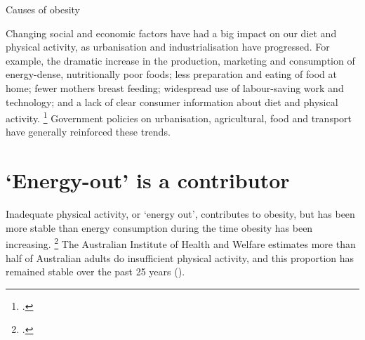 \documentclass[embargoed]{grattan}
\begin{document}
\begin{table}
\caption{Causes of obesity} \label{tbl:causes-of-obesity}




\end{table}

Changing social and economic factors have had a big impact on our diet and physical activity, as urbanisation and industrialisation have progressed.
For example, the dramatic increase in the production, marketing and consumption of energy-dense, nutritionally poor foods; less preparation and eating of food at home; fewer mothers breast feeding; widespread use of labour-saving work and technology; and a lack of clear consumer information about diet and physical activity.%
\footcites{Livingston2012JAMAobesitytheme}{Ewart-Pierce2016WholeCommunityObesity}{Roberto2015Patchyprogressobesity}{Keith2006Putativecontributorssecular}{Wright2012Causesobesity}{Lakdawalla2009growthobesitytechnological}{Popkin2004nutritiontransitionworldwide}{Popkin2001nutritiontransitionobesity}{Karnani2016ObesityCrisisas}{Bray2004Consumptionhighfructose}{Organisation2000Obesitypreventingmanaging}{Swinburn2004Dietnutritionprevention} Government policies on urbanisation, agricultural, food and transport have generally reinforced these trends.



\section{`Energy-out' is a contributor }\label{energy-out-is-a-contributor}

Inadequate physical activity, or `energy out', contributes to obesity, but has been more stable than energy consumption during the time obesity has been increasing.%
\footcites{Keith2006Putativecontributorssecular}{Popkin2004nutritiontransitionworldwide}{Stubbs2004obesityepidemicboth} The Australian Institute of Health and Welfare estimates more than half of Australian adults do insufficient physical activity, and this proportion has remained stable over the past 25 years ().
\end{document}
